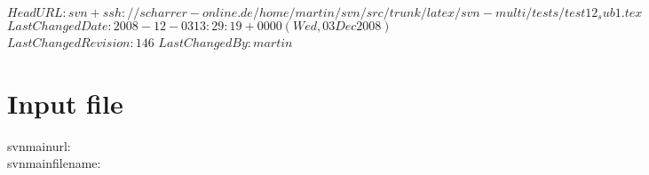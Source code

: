 \svnidlong
{$HeadURL: svn+ssh://scharrer-online.de/home/martin/svn/src/trunk/latex/svn-multi/tests/test12_sub1.tex $}
{$LastChangedDate: 2008-12-03 13:29:19 +0000 (Wed, 03 Dec 2008) $}
{$LastChangedRevision: 146 $}
{$LastChangedBy: martin $}

\noindent

\section{Input file}
svnmainurl: \svnnolinkurl{\svnmainurl} \\
svnmainfilename: \svnnolinkurl{\svnmainfilename} \\

